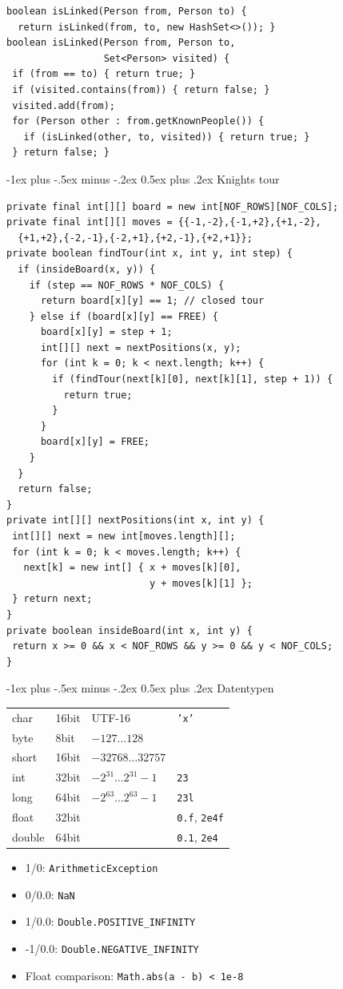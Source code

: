 \documentclass[10pt,landscape,a4paper]{article}
\makeatletter
\renewcommand{\section}{\@startsection{section}{1}{0mm}%
                                {-1ex plus -.5ex minus -.2ex}%
                                {0.5ex plus .2ex}%
                                {\normalfont\large\bfseries}}
\newcommand{\java}[1]{\texttt{#1}}
\makeatother
\begin{document}
\begin{multicols*}{3}
\begin{verbatim}
boolean isLinked(Person from, Person to) {
  return isLinked(from, to, new HashSet<>()); }
boolean isLinked(Person from, Person to,
                 Set<Person> visited) {
 if (from == to) { return true; }
 if (visited.contains(from)) { return false; }
 visited.add(from);
 for (Person other : from.getKnownPeople()) {
   if (isLinked(other, to, visited)) { return true; }
 } return false; }
\end{verbatim}

\section{Knights tour}

\begin{verbatim}
private final int[][] board = new int[NOF_ROWS][NOF_COLS];
private final int[][] moves = {{-1,-2},{-1,+2},{+1,-2},
  {+1,+2},{-2,-1},{-2,+1},{+2,-1},{+2,+1}};
private boolean findTour(int x, int y, int step) {
  if (insideBoard(x, y)) {
    if (step == NOF_ROWS * NOF_COLS) {
      return board[x][y] == 1; // closed tour
    } else if (board[x][y] == FREE) {
      board[x][y] = step + 1;
      int[][] next = nextPositions(x, y);
      for (int k = 0; k < next.length; k++) {
        if (findTour(next[k][0], next[k][1], step + 1)) {
          return true;
        }
      }
      board[x][y] = FREE;
    }
  }
  return false;
}
private int[][] nextPositions(int x, int y) {
 int[][] next = new int[moves.length][];
 for (int k = 0; k < moves.length; k++) {
   next[k] = new int[] { x + moves[k][0],
                         y + moves[k][1] };
 } return next;
}
private boolean insideBoard(int x, int y) {
 return x >= 0 && x < NOF_ROWS && y >= 0 && y < NOF_COLS;
}
\end{verbatim}

\section{Datentypen}
\begin{tabular}{llll}
  char & 16bit & UTF-16 & \java{'x'} \\
  byte & 8bit & $-127\ldots128$ & \\
  short & 16bit & $-32768\ldots32757$ & \\
  int & 32bit & $-2^{31}\ldots2^{31}-1$ & \java{23} \\
  long & 64bit & $-2^{63}\ldots2^{63}-1$ & \java{23l} \\
  float & 32bit & & \java{0.f}, \java{2e4f} \\
  double & 64bit & & \java{0.1}, \java{2e4}
\end{tabular}

\begin{itemize}
\item 1/0: \java{ArithmeticException}
\item 0/0.0: \java{NaN}
\item 1/0.0: \java{Double.POSITIVE_INFINITY}
\item -1/0.0: \java{Double.NEGATIVE_INFINITY}
\item Float comparison: \java{Math.abs(a - b) < 1e-8}
\end{itemize}

\end{multicols*}
\end{document}
